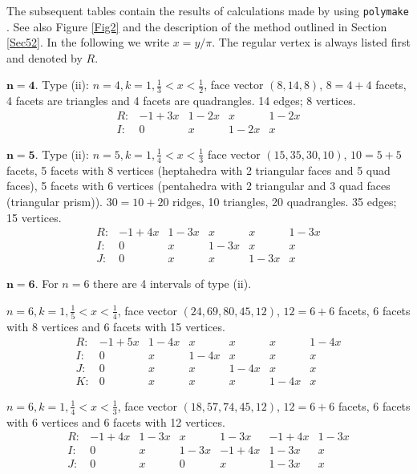 \documentclass[a4paper,11pt,reqno]{amsart}
\theoremstyle{definition}
\numberwithin{equation}{section}
\begin{document}
The subsequent tables contain the results of calculations made by using  {\tt{polymake}}  \cite{poly}.
See also  Figure \ref{Fig2} and the description of the method outlined in Section \ref{Sec52}.
In the following we write $x = y/ \pi$. The regular vertex is always listed first and denoted by $R$.

\goodbreak
\smallskip
\noindent $\mathbf{n=4}$.
Type (ii):
$n=4, k=1, \tfrac13 < x < \tfrac12$, face vector $(8, 14, 8)$, $8=4+4$ facets, 4 facets are triangles and 4 facets are quadrangles. 14 edges; 8 vertices.
\[
\begin{array}{cccccc}
R: &-1+3x & 1-2x &  x & 1 - 2 x \\
I: & 0 &  x & 1 - 2 x & x
\end{array}
\]

\goodbreak
\noindent $\mathbf{n=5}$.
Type (ii): $n=5, k=1, \tfrac14 < x < \tfrac13$
face vector $(15, 35, 30, 10)$, $10 = 5+5$ facets,
5 facets with 8 vertices (heptahedra with 2 triangular faces and 5 quad faces),
5 facets with 6 vertices (pentahedra with 2 triangular and 3 quad faces (triangular prism)).
$30 = 10+20$ ridges, 10 triangles,  20 quadrangles. 35 edges; 15 vertices.
\[
\begin{array}{cccccc}
R: &-1 + 4 x & 1- 3x &  x &   x &  1 - 3 x \\
I: & 0 &  x &  1 - 3 x &  x &  x \\
J: & 0 &  x &  x &  1 - 3 x &  x
\end{array}
\]

\goodbreak
\noindent $\mathbf{n=6}$.
For $n=6$ there are 4 intervals of type (ii).

$n=6, k=1, \tfrac15 < x < \tfrac14$, face vector  $(24, 69, 80, 45, 12)$, %
$12 = 6+6$ facets, 6 facets with 8 vertices and 6 facets with 15 vertices.
\[
\begin{array}{ccccccc}
R: & -1 + 5 x & 1-4 x &  x &  x &   x &  1 - 4 x \\
I: &0 &  x &  1 - 4 x &  x &  x &  x \\
J: & 0 &  x &  x &  1 - 4 x &  x &  x  \\
K: & 0 &  x &  x &  x &  1 - 4 x &  x
\end{array}
\]

$n=6, k=1,  \tfrac14 < x < \tfrac13$, face vector $(18, 57, 74, 45, 12)$, %
$12 = 6+6$ facets, 6 facets with 6 vertices and 6 facets with 12 vertices.
\[
\begin{array}{ccccccc}
R: &  -1 + 4 x &  1 - 3 x &  x &  1 - 3 x &  -1 + 4 x &  1 - 3 x\\
I: &  0 &  x &  1 - 3 x &  -1 + 4 x &  1 - 3 x  & x \\
J: &  0  & x & 0 &  x &  1 - 3 x &  x
\end{array}
\]
\end{document}
